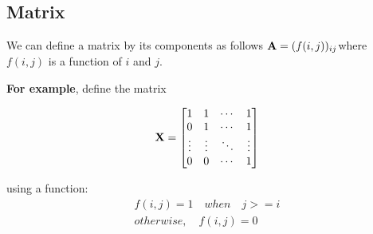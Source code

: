 \documentclass[11pt]{article}
\begin{document}
\begin{flushleft}
\subsection{Matrix}
We can define a matrix by its components as follows
$\textbf A=(f(i,j))_{ij}$where $f(i, j)$ is a function of $i$ and $j$.\newline 

\textbf{For example}, define the matrix 

$$
\textbf X = 
\begin{bmatrix} 
1 & 1 & \cdots & 1\\ 
0 & 1 & \cdots & 1\\ 
\vdots&\vdots&\ddots&\vdots\\ 0& 0 & \cdots & 1\\ 
\end{bmatrix}
$$

using a function: \newline
\begin{align*}
    f(i, j) = 1 \quad when\quad j >= i \\
    otherwise,\quad f(i, j)=0
\end{align*}
\end{flushleft}
\end{document}
